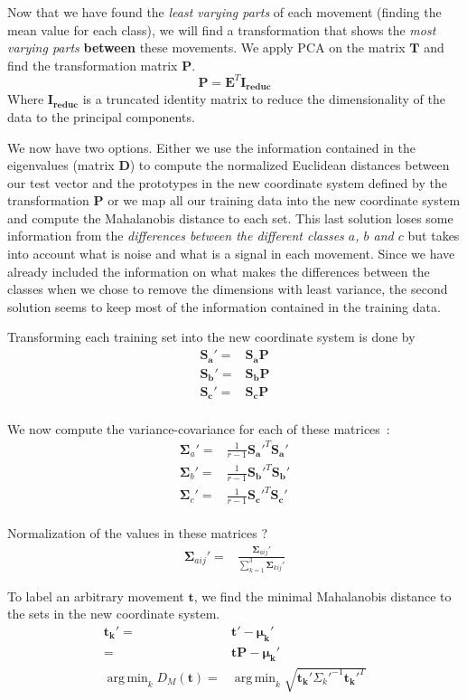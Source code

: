 \documentclass[11pt,twocolumn]{amsart} %
\DeclareMathOperator*{\argmin}{arg\,min}
\newcommand{\ve}[1]{\boldsymbol{#1}}
\newcommand{\ma}[1]{\boldsymbol{#1}}
\begin{document}
Now that we have found the \emph{least varying parts} of each movement (finding the mean value for each class), we will find a transformation that shows the \emph{most varying parts} \textbf{between} these movements. We apply PCA on the matrix $\ma{T}$ and find the transformation matrix $\ma{P}$.
\[
  \ma{P} = \ma{E}^T \ma{I_{reduc}}
\]
Where $\ma{I_{reduc}}$ is a truncated identity matrix to reduce the dimensionality of the data to the principal components.

We now have two options. Either we use the information contained in the eigenvalues (matrix $\ma{D}$) to compute the normalized Euclidean distances between our test vector and the prototypes in the new coordinate system defined by the transformation $\ma{P}$ or we map all our training data into the new coordinate system and compute the Mahalanobis distance to each set. This last solution loses some information from the \emph{differences between the different classes $a$, $b$ and $c$} but takes into account what is noise and what is a signal in each movement. Since we have already included the information on what makes the differences between the classes when we chose to remove the dimensions with least variance, the second solution seems to keep most of the information contained in the training data.

Transforming each training set into the new coordinate system is done by
\begin{align*}
  \ma{S_{a}'} = & \ma{S_a}\ma{P} \\
  \ma{S_{b}'} = & \ma{S_b}\ma{P} \\
  \ma{S_{c}'} = & \ma{S_c}\ma{P} \\
\end{align*}

We now compute the variance-covariance for each of these matrices~:
\begin{align*}
  \ma\Sigma_a' = & \frac{1}{r-1}\ma{S_{a}'}^T\ma{S_{a}'} \\
  \ma\Sigma_b' = & \frac{1}{r-1}\ma{S_{b}'}^T\ma{S_{b}'} \\
  \ma\Sigma_c' = & \frac{1}{r-1}\ma{S_{c}'}^T\ma{S_{c}'} \\
\end{align*}

Normalization of the values in these matrices ?
\begin{align*}
  \ma\Sigma_{aij}' = & \frac{\ma\Sigma_{aij}'}{\sum_{k=1}^3 \ma\Sigma_{kij}'}
\end{align*}

To label an arbitrary movement $\ve{t}$, we find the minimal Mahalanobis distance to the sets in the new coordinate system.
\begin{align*}
  \ve{t_k'} = & \ve{t'} - \ve{\mu_k'} \\
            = & \ve{t}\ma{P} - \ve{\mu_k'} \\
  \argmin_{k} D_M(\ve{t}) = & \argmin_{k} \sqrt{\ve{t_k'}\Sigma_k'^{-1}\ve{t_k'}^T}
\end{align*}
\end{document}
